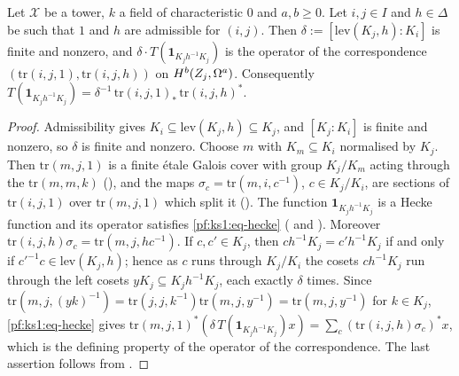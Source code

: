 \begin{lemma}\label{pf:ks1:lem-hopop}
Let $\mathcal X$ be a tower, $k$ a field of characteristic $0$ and $a,b\ge0$. Let $i,j\in I$ and $h\in\Delta$ be such that
$1$ and $h$ are admissible for $(i,j)$. Then $\delta:=[\mathrm{lev}(K_j,h):K_i]$ is finite and nonzero, and
$\delta\cdot T(\mathbf 1_{K_jh^{-1}K_j})$ is the operator of the correspondence
$(\mathrm{tr}(i,j,1),\mathrm{tr}(i,j,h))$ on $\ksoneH{Z_j}{a}{b}$. Consequently
$T(\mathbf 1_{K_jh^{-1}K_j})=\delta^{-1}\,\mathrm{tr}(i,j,1)_*\,\mathrm{tr}(i,j,h)^*$.
\end{lemma}

\begin{proof}
Admissibility gives $K_i\subseteq\mathrm{lev}(K_j,h)\subseteq K_j$, and $[K_j:K_i]$ is finite and nonzero, so $\delta$ is
finite and nonzero. Choose $m$ with $K_m\subseteq K_i$ normalised by $K_j$. Then $\mathrm{tr}(m,j,1)$ is a finite \'etale Galois
cover with group $K_j/K_m$ acting through the $\mathrm{tr}(m,m,k)$ (), and the maps
$\sigma_c=\mathrm{tr}(m,i,c^{-1})$, $c\in K_j/K_i$, are sections of $\mathrm{tr}(i,j,1)$ over $\mathrm{tr}(m,j,1)$ which split it
(). The function $\mathbf 1_{K_jh^{-1}K_j}$ is a Hecke function and its operator
satisfies \eqref{pf:ks1:eq-hecke} ( and ). Moreover
$\mathrm{tr}(i,j,h)\sigma_c=\mathrm{tr}(m,j,hc^{-1})$. If $c,c'\in K_j$, then $ch^{-1}K_j=c'h^{-1}K_j$ if and only if
$c'^{-1}c\in\mathrm{lev}(K_j,h)$; hence as $c$ runs through $K_j/K_i$ the cosets $ch^{-1}K_j$ run through the left cosets
$yK_j\subseteq K_jh^{-1}K_j$, each exactly $\delta$ times. Since $\mathrm{tr}(m,j,(yk)^{-1})=\mathrm{tr}(j,j,k^{-1})\mathrm{tr}(m,j,y^{-1})=
\mathrm{tr}(m,j,y^{-1})$ for $k\in K_j$, \eqref{pf:ks1:eq-hecke} gives
$\mathrm{tr}(m,j,1)^*(\delta\,T(\mathbf 1_{K_jh^{-1}K_j})x)=\sum_c(\mathrm{tr}(i,j,h)\sigma_c)^*x$, which is the defining property of
the operator of the correspondence. The last assertion follows from .
\end{proof}

